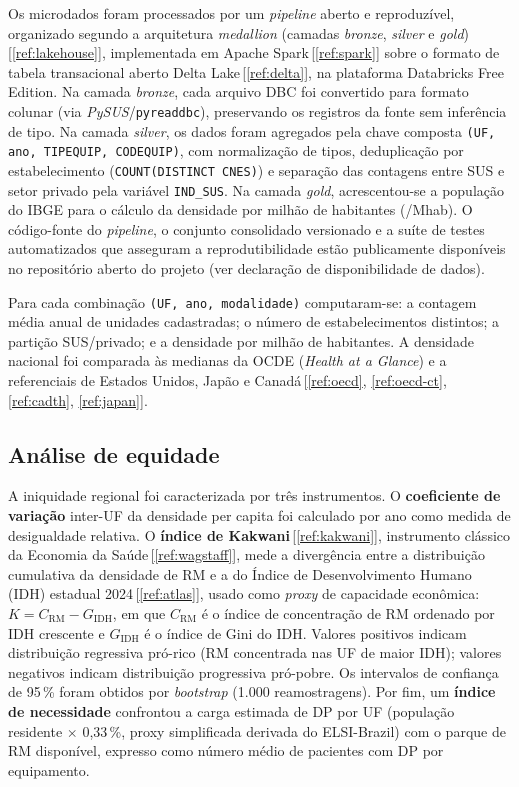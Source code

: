 \documentclass[12pt,a4paper,oneside]{article}
\begin{document}
Os microdados foram processados por um \textit{pipeline} aberto e
reproduzível, organizado segundo a arquitetura \textit{medallion}
(camadas \textit{bronze}, \textit{silver} e
\textit{gold})\,[\ref{ref:lakehouse}], implementada em Apache
Spark\,[\ref{ref:spark}] sobre o formato de tabela transacional aberto
Delta Lake\,[\ref{ref:delta}], na plataforma Databricks Free Edition.
Na camada \textit{bronze}, cada arquivo DBC foi convertido para formato
colunar (via \textit{PySUS}/\texttt{pyreaddbc}), preservando os
registros da fonte sem inferência de tipo. Na camada \textit{silver},
os dados foram agregados pela chave composta
\texttt{(UF, ano, TIPEQUIP, CODEQUIP)}, com normalização de tipos,
deduplicação por estabelecimento (\texttt{COUNT(DISTINCT CNES)}) e
separação das contagens entre SUS e setor privado pela variável
\texttt{IND\_SUS}. Na camada \textit{gold}, acrescentou-se a população
do IBGE para o cálculo da densidade por milhão de habitantes (/Mhab).
O código-fonte do \textit{pipeline}, o conjunto consolidado versionado
e a suíte de testes automatizados que asseguram a reprodutibilidade
estão publicamente disponíveis no repositório aberto do projeto (ver
declaração de disponibilidade de dados).

Para cada combinação \texttt{(UF, ano, modalidade)} computaram-se:
a contagem média anual de unidades cadastradas; o número de
estabelecimentos distintos; a partição SUS/privado; e a densidade por
milhão de habitantes. A densidade nacional foi comparada às medianas
da OCDE (\textit{Health at a Glance}) e a referenciais de Estados
Unidos, Japão e Canadá\,[\ref{ref:oecd}, \ref{ref:oecd-ct},
\ref{ref:cadth}, \ref{ref:japan}].

\subsection{Análise de equidade}

A iniquidade regional foi caracterizada por três instrumentos. O
\textbf{coeficiente de variação} inter-UF da densidade per capita foi
calculado por ano como medida de desigualdade relativa. O
\textbf{índice de Kakwani}\,[\ref{ref:kakwani}], instrumento clássico
da Economia da Saúde\,[\ref{ref:wagstaff}], mede a divergência entre a
distribuição cumulativa da densidade de RM e a do Índice de
Desenvolvimento Humano (IDH) estadual 2024\,[\ref{ref:atlas}], usado
como \textit{proxy} de capacidade econômica: $K = C_{\text{RM}} -
G_{\text{IDH}}$, em que $C_{\text{RM}}$ é o índice de concentração de
RM ordenado por IDH crescente e $G_{\text{IDH}}$ é o índice de Gini do
IDH. Valores positivos indicam distribuição regressiva pró-rico
(RM concentrada nas UF de maior IDH); valores negativos indicam
distribuição progressiva pró-pobre. Os intervalos de confiança de
95\,\% foram obtidos por \textit{bootstrap} (1.000 reamostragens).
Por fim, um \textbf{índice de necessidade} confrontou a carga
estimada de DP por UF (população residente $\times$ 0,33\,\%, proxy
simplificada derivada do ELSI-Brazil) com o parque de RM disponível,
expresso como número médio de pacientes com DP por equipamento.
\end{document}
